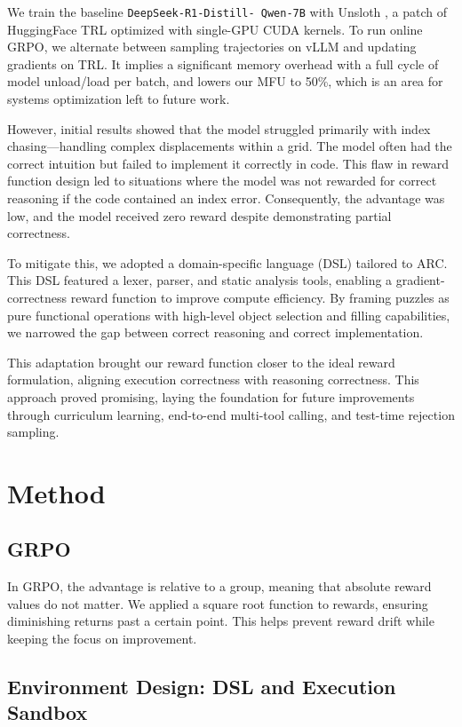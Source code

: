\documentclass{article}
\begin{document}
We train the baseline \texttt{DeepSeek-R1-Distill- Qwen-7B} with Unsloth \cite{unsloth}, a patch of HuggingFace TRL \cite{trl} optimized with single-GPU CUDA kernels. To run online GRPO, we alternate between sampling trajectories on vLLM \cite{vllm} and updating gradients on TRL. It implies a significant memory overhead with a full cycle of model unload/load per batch, and lowers our MFU to 50\%, which is an area for systems optimization left to future work.

However, initial results showed that the model struggled primarily with index chasing—handling complex displacements within a grid. The model often had the correct intuition but failed to implement it correctly in code. This flaw in reward function design led to situations where the model was not rewarded for correct reasoning if the code contained an index error. Consequently, the advantage was low, and the model received zero reward despite demonstrating partial correctness.

To mitigate this, we adopted a domain-specific language (DSL) tailored to ARC. This DSL featured a lexer, parser, and static analysis tools, enabling a gradient-correctness reward function to improve compute efficiency. By framing puzzles as pure functional operations with high-level object selection and filling capabilities, we narrowed the gap between correct reasoning and correct implementation.

This adaptation brought our reward function closer to the ideal reward formulation, aligning execution correctness with reasoning correctness. This approach proved promising, laying the foundation for future improvements through curriculum learning, end-to-end multi-tool calling, and test-time rejection sampling.

\section{Method}

\subsection{GRPO}

In GRPO, the advantage is relative to a group, meaning that absolute reward values do not matter. We applied a square root function to rewards, ensuring diminishing returns past a certain point. This helps prevent reward drift while keeping the focus on improvement.

\subsection{Environment Design: DSL and Execution Sandbox}
\end{document}

